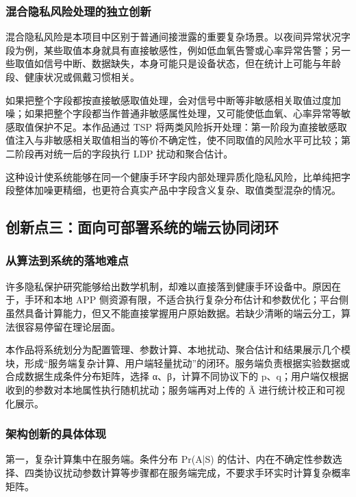 \documentclass{cumcmthesis}
\numberwithin{equation}{section}
\numberwithin{figure}{section}
\numberwithin{table}{section}
\begin{document}
\subsubsection{混合隐私风险处理的独立创新}

混合隐私风险是本项目中区别于普通间接泄露的重要复杂场景。以夜间异常状况字段为例，某些取值本身就具有直接敏感性，例如低血氧告警或心率异常告警；另一些取值如信号中断、数据缺失，本身可能只是设备状态，但在统计上可能与年龄段、健康状况或佩戴习惯相关。

如果把整个字段都按直接敏感取值处理，会对信号中断等非敏感相关取值过度加噪；如果把整个字段都当作普通非敏感属性处理，又可能使低血氧、心率异常等敏感取值保护不足。本作品通过 TSP 将两类风险拆开处理：第一阶段为直接敏感取值注入与非敏感相关取值相当的等价不确定性，使不同取值的风险水平可比较；第二阶段再对统一后的字段执行 LDP 扰动和聚合估计。

这种设计使系统能够在同一个健康手环字段内部处理异质化隐私风险，比单纯把字段整体加噪更精细，也更符合真实产品中字段含义复杂、取值类型混杂的情况。

\subsection{创新点三：面向可部署系统的端云协同闭环}

\subsubsection{从算法到系统的落地难点}

许多隐私保护研究能够给出数学机制，却难以直接落到健康手环设备中。原因在于，手环和本地 APP 侧资源有限，不适合执行复杂分布估计和参数优化；平台侧虽然具备计算能力，但又不能直接掌握用户原始数据。若缺少清晰的端云分工，算法很容易停留在理论层面。

本作品将系统划分为配置管理、参数计算、本地扰动、聚合估计和结果展示几个模块，形成“服务端复杂计算、用户端轻量扰动”的闭环。服务端负责根据实验数据或合成数据生成条件分布矩阵，选择 α、β，计算不同协议下的 p、q；用户端仅根据收到的参数对本地属性执行随机扰动；服务端再对上传的 Ã 进行统计校正和可视化展示。

\subsubsection{架构创新的具体体现}

第一，复杂计算集中在服务端。条件分布 Pr(A|S) 的估计、内在不确定性参数选择、四类协议扰动参数计算等步骤都在服务端完成，不要求手环实时计算复杂概率矩阵。
\end{document}
